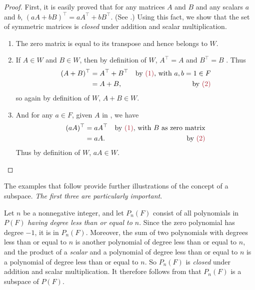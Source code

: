 \begin{proof}
First, it is easily proved that for any matrices \(A\) and \(B\) and any scalars \(a\) and \(b\), \((aA + bB)^\top = aA^\top + bB^\top\).  (See .)
Using this fact, we show that the set of symmetric matrices is \emph{closed} under addition and scalar multiplication.

\begin{enumerate}
    \item The zero matrix is equal to its transpose and hence belongs to \(W\).
    \item If \(A \in W\) and \(B \in W\), then by definition of \(W\), \(A^\top = A\) and \(B^\top = B\) .
          Thus
          \begin{align*}
              (A + B)^\top & = A^\top + B^\top & \text{by \MAROON{(1)}, with \(a, b = 1 \in F\)} \\
                        & = A + B, & \text{by \MAROON{(2)}}
          \end{align*}
          so again by definition of \(W\), \(A + B \in W\).
    \item And for any \(a \in F\), given \(A\) in , we have
        \begin{align*}
            (aA)^\top & = aA^\top & \text{by \MAROON{(1)}, with \(B\) as zero matrix} \\
                   & = aA. & \text{by \MAROON{(2)}}
        \end{align*}
        Thus by definition of \(W\), \(aA \in W\).
\end{enumerate}
\end{proof}

\begin{note}
The examples that follow provide further illustrations of the concept of a subspace. \emph{The first three are particularly important}.
\end{note}

\begin{example} \label{example 1.3.1}
Let \(n\) be a nonnegative integer, and let \(P_n(F)\) consist of all polynomials in \(P(F)\) \emph{having degree less than or equal to \(n\)}.
Since the zero polynomial has degree \(-1\), it is in \(P_n(F)\).
Moreover, the sum of two polynomials with degrees less than or equal to \(n\) is another polynomial of degree less than or equal to \(n\), and the product of a \emph{scalar} and a polynomial of degree less than or equal to \(n\) is a polynomial of degree less than or equal to \(n\).
So \(P_n(F)\) is \emph{closed} under addition and scalar multiplication.
It therefore follows from  that \(P_n(F)\) is a subspace of \(P(F)\).
\end{example}

